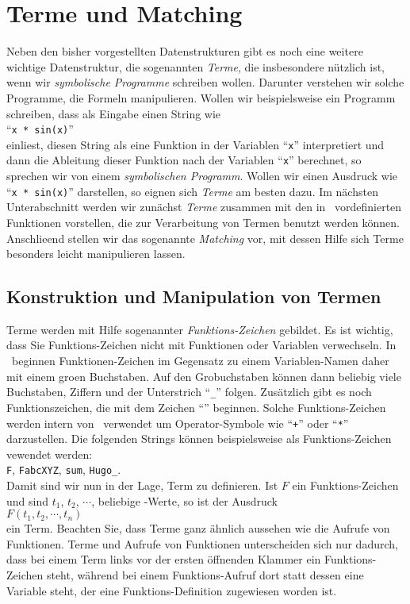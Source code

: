 \section{Terme und Matching}
Neben den bisher vorgestellten Datenstrukturen gibt es noch eine weitere wichtige
Datenstruktur, die sogenannten \emph{Terme}, die insbesondere n\"{u}tzlich ist, wenn wir
\emph{symbolische Programme} 
schreiben wollen.  Darunter verstehen wir solche Programme, die Formeln manipulieren.
Wollen wir beispielsweise ein Programm schreiben, dass als Eingabe einen String wie
\\[0.2cm]
\hspace*{1.3cm}
``\texttt{x * sin(x)}''
\\[0.2cm]
einliest, diesen String als eine Funktion in der Variablen ``\texttt{x}'' interpretiert
und dann die Ableitung dieser Funktion nach der Variablen ``\texttt{x}'' berechnet, so
sprechen wir von einem \emph{symbolischen Programm}.   Wollen wir einen Ausdruck wie 
``\texttt{x * sin(x)}'' darstellen, so eignen sich \emph{Terme} am besten dazu.
Im n\"{a}chsten Unterabschnitt werden wir zun\"{a}chst \emph{Terme} zusammen mit den in \setl\
vordefinierten Funktionen vorstellen, die zur Verarbeitung von Termen benutzt werden k\"{o}nnen.
Anschlie\3end stellen wir das sogenannte \emph{Matching} vor, mit dessen Hilfe sich Terme
besonders leicht manipulieren lassen.


\subsection{Konstruktion und Manipulation von Termen}
Terme werden mit Hilfe sogenannter \emph{Funktions-Zeichen} gebildet.  Es ist wichtig,
dass Sie Funktions-Zeichen nicht mit Funktionen oder Variablen verwechseln.  In \setl\
beginnen Funktionen-Zeichen im Gegensatz zu einem Variablen-Namen daher mit einem gro\3en
Buchstaben.  Auf den Gro\3buchstaben k\"{o}nnen  dann beliebig viele Buchstaben, Ziffern und
der Unterstrich ``\texttt{\_}'' folgen.
Zus\"{a}tzlich gibt es noch Funktionszeichen, die mit dem Zeichen
``\texttt{\symbol{94}}''
beginnen.  Solche Funktions-Zeichen werden intern von \setl\ verwendet um Operator-Symbole
wie ``\texttt{+}'' oder ``\texttt{*}'' darzustellen.
Die folgenden Strings k\"{o}nnen beispielsweise  als Funktions-Zeichen vewendet werden:
\\[0.2cm]
\hspace*{1.3cm}
\texttt{F}, \quad \texttt{FabcXYZ}, \quad \texttt{sum}, \quad \texttt{Hugo\_}.
\\[0.2cm]
Damit sind wir nun in der Lage, Term zu definieren.  Ist $F$ ein Funktions-Zeichen und sind
$t_1$, $t_2$, $\cdots$, beliebige \setl-Werte, so ist der Ausdruck
\\[0.2cm]
\hspace*{1.3cm}
$F(t_1, t_2, \cdots, t_n)$
\\[0.2cm]
ein Term.  Beachten Sie, dass Terme ganz \"{a}hnlich aussehen wie die Aufrufe von Funktionen.
Terme und Aufrufe von Funktionen unterscheiden sich nur dadurch, dass bei einem Term links
vor der ersten \"{o}ffnenden Klammer ein Funktions-Zeichen steht, w\"{a}hrend bei einem
Funktions-Aufruf dort statt dessen eine Variable steht, der eine Funktions-Definition zugewiesen
worden ist.

